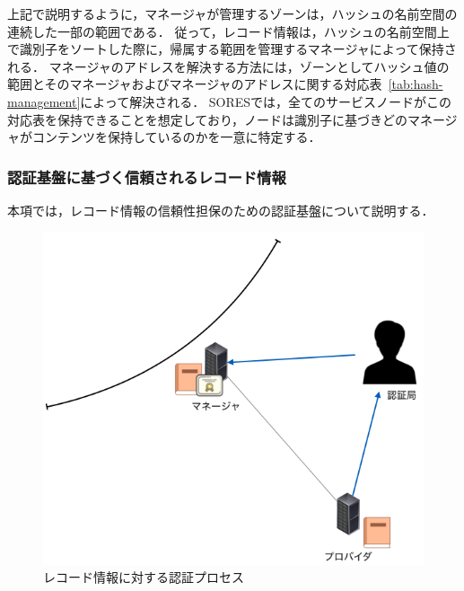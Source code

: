 上記で説明するように，マネージャが管理するゾーンは，ハッシュの名前空間の連続した一部の範囲である．
従って，レコード情報は，ハッシュの名前空間上で識別子をソートした際に，帰属する範囲を管理するマネージャによって保持される．
マネージャのアドレスを解決する方法には，ゾーンとしてハッシュ値の範囲とそのマネージャおよびマネージャのアドレスに関する対応表~\ref{tab:hash-management}によって解決される．
SORESでは，全てのサービスノードがこの対応表を保持できることを想定しており，ノードは識別子に基づきどのマネージャがコンテンツを保持しているのかを一意に特定する．


\subsubsection{認証基盤に基づく信頼されるレコード情報}
\label{sec:certificate}
本項では，レコード情報の信頼性担保のための認証基盤について説明する．
\begin{figure}[h]
 \centering
 \includegraphics[scale=0.5]{figure/certificate-procedure.png}
 \caption{レコード情報に対する認証プロセス}
 \label{fig:manager-provider}
\end{figure}

